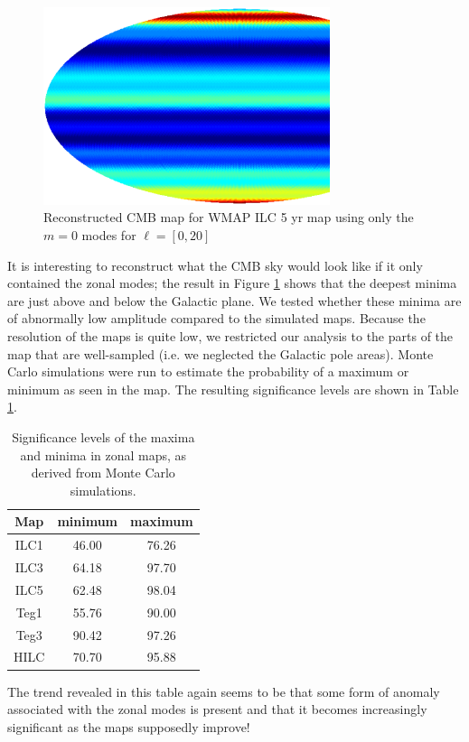 \documentclass[useAMS,usenatbib,usegraphicx]{mn2e}
\def\l{{\ell}}
\begin{document}
\begin{figure}
  \centering
  \includegraphics[width = 84mm]{wmap5_map.ps}
  \caption{Reconstructed CMB map for WMAP ILC 5 yr map using only the $m=0$ modes for $\l = [0,20]$}
  \label{fig2}
\end{figure}
It is interesting to reconstruct what the CMB sky would look like if
it only contained the zonal modes; the result in Figure \ref{fig2}
shows that the deepest minima are just above and below the Galactic
plane. We tested whether these minima are of abnormally low
amplitude compared to the simulated maps. Because the resolution of the
maps is quite low, we restricted our analysis to the parts of the
map that are well-sampled (i.e. we neglected the Galactic pole
areas). Monte Carlo simulations were run to estimate the probability
of a maximum or minimum as seen in the map. The resulting
significance levels are shown in Table \ref{TABcol}.
\begin{table}
\begin{center}
  \begin{tabular}{|c|c|c|}
    \hline \hline
    Map &  minimum &  maximum \\ \hline
    ILC1     &  46.00  &   76.26    \\
    ILC3     &  64.18  &   97.70  \\
    ILC5     &  62.48  &   98.04    \\
    Teg1     &  55.76  &   90.00         \\
    Teg3     &  90.42  &   97.26      \\
    HILC     &  70.70  &   95.88      \\ \hline
    \hline
  \end{tabular}
  \caption{Significance levels of the maxima and minima in zonal maps, as derived from Monte Carlo simulations.}
  \label{TABcol}
\end{center}
\end{table}
The trend revealed in this table again seems to be that some form of
anomaly associated with the zonal modes is present and that it
becomes increasingly significant as the maps supposedly improve!
\end{document}
